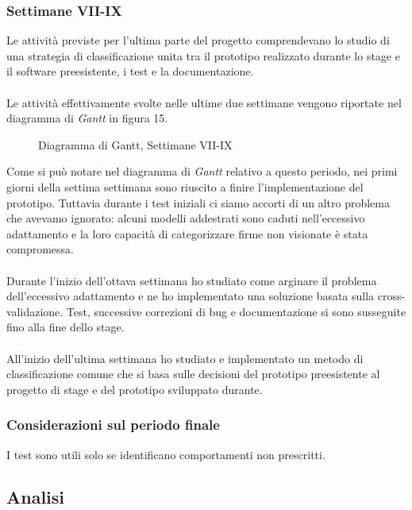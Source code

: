 \subsubsection{Settimane VII-IX}
\label{3.1.4}
Le attività previste per l'ultima parte del progetto comprendevano lo studio di una strategia di classificazione unita tra il prototipo realizzato durante lo stage e il software preesistente, i test e la documentazione.\\\\
Le attività effettivamente svolte nelle ultime due settimane vengono riportate nel diagramma di \emph{Gantt} in figura 15.
\begin{figure}[H]
\centering
\noindent{}
\caption{Diagramma di Gantt, Settimane VII-IX}
\end{figure}
Come si può notare nel diagramma di \emph{Gantt} relativo a questo periodo, nei primi giorni della settima settimana sono riuscito a finire l'implementazione del prototipo. Tuttavia durante i test iniziali ci siamo accorti di un altro problema che avevamo ignorato: alcuni modelli addestrati sono caduti nell'eccessivo adattamento e la loro capacità di categorizzare firme non visionate è stata compromessa.\\\\
Durante l'inizio dell'ottava settimana ho studiato come arginare il problema dell'eccessivo adattamento e ne ho implementato una soluzione basata sulla cross-validazione. Test, successive correzioni di bug e documentazione si sono susseguite fino alla fine dello stage.\\\\
All'inizio dell'ultima settimana ho studiato e implementato un metodo di classificazione comune che si basa sulle decisioni del prototipo preesistente al progetto di stage e del prototipo sviluppato durante.
\subsubsection*{Considerazioni sul periodo finale}
\label{3.1.4.1}
I test sono utili solo se identificano comportamenti non prescritti.
\subsection{Analisi}
\label{3.2}

